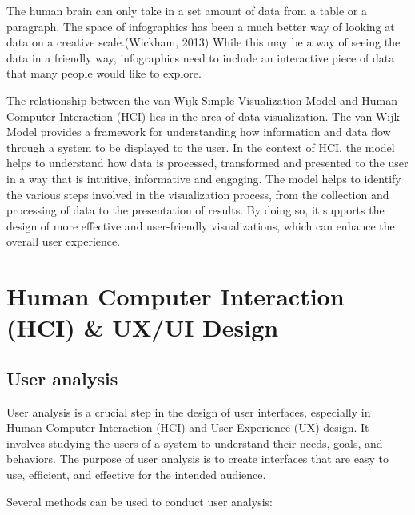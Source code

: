 \documentclass[print]{nuthesis}
\begin{document}
The human brain can only take in a set amount of data from a table or a paragraph. 
The space of infographics has been a much better way of looking at data on a creative scale.(Wickham, 2013)
While this may be a way of seeing the data in a friendly way, infographics need to include an interactive piece of data that many people would like to explore.

The relationship between the van Wijk Simple Visualization Model and Human-Computer Interaction (HCI) lies in the area of data visualization. The van Wijk Model provides a framework for understanding how information and data flow through a system to be displayed to the user. In the context of HCI, the model helps to understand how data is processed, transformed and presented to the user in a way that is intuitive, informative and engaging. The model helps to identify the various steps involved in the visualization process, from the collection and processing of data to the presentation of results. By doing so, it supports the design of more effective and user-friendly visualizations, which can enhance the overall user experience.

\hypertarget{human-computer-interaction-hci-uxui-design}{%
\section{Human Computer Interaction (HCI) \& UX/UI Design}\label{human-computer-interaction-hci-uxui-design}}

\hypertarget{user-analysis}{%
\subsection{User analysis}\label{user-analysis}}

User analysis is a crucial step in the design of user interfaces, especially in Human-Computer Interaction (HCI) and User Experience (UX) design. It involves studying the users of a system to understand their needs, goals, and behaviors. The purpose of user analysis is to create interfaces that are easy to use, efficient, and effective for the intended audience.

Several methods can be used to conduct user analysis:
\end{document}
